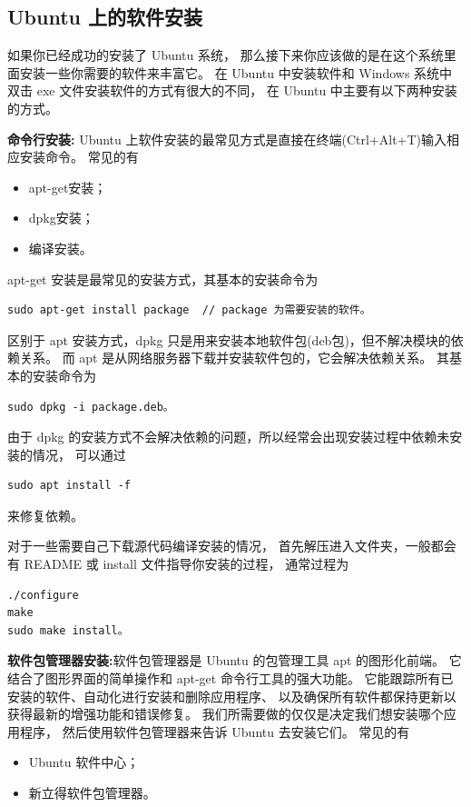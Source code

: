 \subsection{Ubuntu 上的软件安装}

如果你已经成功的安装了 Ubuntu 系统，
那么接下来你应该做的是在这个系统里面安装一些你需要的软件来丰富它。
在 Ubuntu 中安装软件和 Windows 系统中双击 exe 文件安装软件的方式有很大的不同，
在 Ubuntu 中主要有以下两种安装的方式。

\textbf{命令行安装:} Ubuntu 上软件安装的最常见方式是直接在终端(Ctrl+Alt+T)输入相应安装命令。
常见的有
\begin{itemize}
	\item apt-get安装；
	\item dpkg安装；
	\item 编译安装。
\end{itemize}

apt-get 安装是最常见的安装方式，其基本的安装命令为
\begin{verbatim}
sudo apt-get install package  // package 为需要安装的软件。
\end{verbatim}

区别于 apt 安装方式，dpkg 只是用来安装本地软件包(deb包)，但不解决模块的依赖关系。
而 apt 是从网络服务器下载并安装软件包的，它会解决依赖关系。
其基本的安装命令为
\begin{verbatim}
sudo dpkg -i package.deb。
\end{verbatim}
由于 dpkg 的安装方式不会解决依赖的问题，所以经常会出现安装过程中依赖未安装的情况，
可以通过
\begin{verbatim}
sudo apt install -f	
\end{verbatim}
来修复依赖。

对于一些需要自己下载源代码编译安装的情况，
首先解压进入文件夹，一般都会有 README 或 install 文件指导你安装的过程，
通常过程为
\begin{verbatim}
./configure
make
sudo make install。
\end{verbatim}

\textbf{软件包管理器安装:}软件包管理器是 Ubuntu 的包管理工具 apt 的图形化前端。
它结合了图形界面的简单操作和 apt-get 命令行工具的强大功能。
它能跟踪所有已安装的软件、自动化进行安装和删除应用程序、
以及确保所有软件都保持更新以获得最新的增强功能和错误修复。
我们所需要做的仅仅是决定我们想安装哪个应用程序，
然后使用软件包管理器来告诉 Ubuntu 去安装它们。
常见的有
\begin{itemize}
	\item Ubuntu 软件中心；
	\item 新立得软件包管理器。
\end{itemize}

